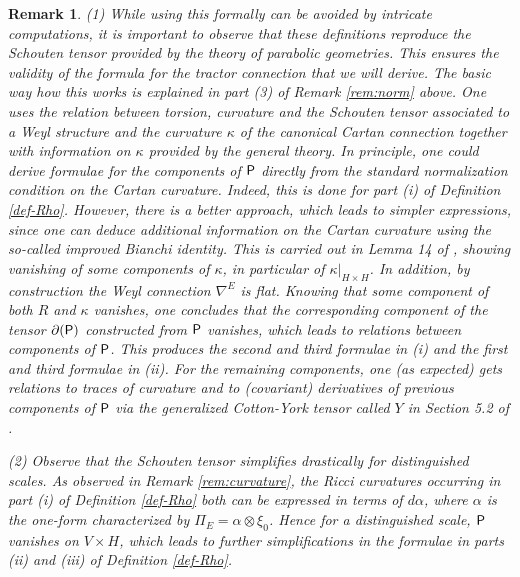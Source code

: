 \documentclass[11pt]{amsart}
\def\Rho{\mbox{\textsf{P}}}
\newtheorem{remark}[proposition]{Remark}
\numberwithin{proposition}{section}
\numberwithin{equation}{section}
\begin{document}
\begin{remark}\label{rem:Rho}
(1) While using this formally can be avoided by intricate computations, it is important to observe that these definitions reproduce the Schouten tensor provided by the theory of parabolic geometries. This ensures the validity of the formula for the tractor connection that we will derive. The basic way how this works is explained in part (3) of Remark \ref{rem:norm} above. One uses the relation between torsion, curvature and the Schouten tensor associated to a Weyl structure and the curvature $\kappa$ of the canonical Cartan connection together with information on $\kappa$ provided by the general theory. In principle, one could derive formulae for the components of $\Rho$ directly from the standard normalization condition on the Cartan curvature. Indeed, this is done for part (i) of Definition \ref{def-Rho}. However, there is a better approach, which leads to simpler expressions, since one can deduce additional information on the Cartan curvature using the so-called improved Bianchi identity. This is carried out in Lemma 14 of \cite{Guo_Fef}, showing vanishing of some components of $\kappa$, in particular of $\kappa|_{H\times H}$. In addition, by construction the Weyl connection $\nabla^E$ is flat. Knowing that some component of both $R$ and $\kappa$ vanishes, one concludes that the corresponding component of the tensor $\partial(\Rho)$ constructed from $\Rho$ vanishes, which leads to relations between components of $\Rho$. This produces the second and third formulae in (i) and the first and third formulae in (ii). For the remaining components, one (as expected) gets relations to traces of curvature and to (covariant) derivatives of previous components of $\Rho$ via the generalized Cotton-York tensor called $Y$ in Section 5.2 of \cite{Book}. 

(2) Observe that the Schouten tensor simplifies drastically for distinguished scales. As observed in Remark  \ref{rem:curvature}, the Ricci curvatures occurring in part (i) of Definition \ref{def-Rho} both can be expressed in terms of $d\alpha$, where $\alpha$ is the one-form characterized by $\Pi_E=\alpha\otimes\xi_0$. Hence for a distinguished scale, $\Rho$ vanishes on $V\times H$, which leads to further simplifications in the formulae in parts (ii) and (iii) of Definition \ref{def-Rho}. 
\end{remark}
\end{document}
